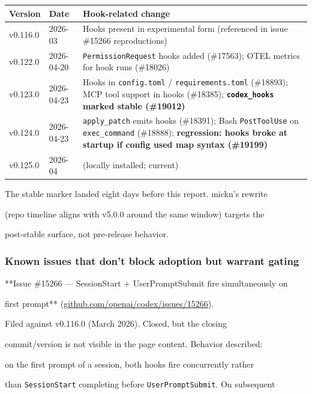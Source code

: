 \documentclass[twocolumn,10pt,letterpaper]{article}
\begin{document}
\vspace{0.4em}
\noindent
\small
\begin{tabularx}{\columnwidth}{@{}XXX@{}}
\toprule
\textbf{Version} & \textbf{Date} & \textbf{Hook-related change} \\
\midrule
v0.116.0 & 2026-03 & Hooks present in experimental form (referenced in issue \#15266 reproductions) \\
v0.122.0 & 2026-04-20 & \texttt{PermissionRequest} hooks added (\#17563); OTEL metrics for hook runs (\#18026) \\
v0.123.0 & 2026-04-23 & Hooks in \texttt{config.toml} / \texttt{requirements.toml} (\#18893); MCP tool support in hooks (\#18385); \textbf{\texttt{codex\_hooks} marked stable (\#19012)} \\
v0.124.0 & 2026-04-23 & \texttt{apply\_patch} emits hooks (\#18391); Bash \texttt{PostToolUse} on \texttt{exec\_command} (\#18888); \textbf{regression: hooks broke at startup if config used map syntax (\#19199)} \\
v0.125.0 & 2026-04 & (locally installed; current) \\
\bottomrule
\end{tabularx}
\vspace{0.4em}

The stable marker landed eight days before this report. mickn's rewrite

(repo timeline aligns with v5.0.0 around the same window) targets the

post-stable surface, not pre-release behavior.


\subsubsection{Known issues that don't block adoption but warrant gating}

**Issue \#15266 — SessionStart + UserPromptSubmit fire simultaneously on

first prompt** (\href{https://github.com/openai/codex/issues/15266}{github.com/openai/codex/issues/15266}).

Filed against v0.116.0 (March 2026). Closed, but the closing

commit/version is not visible in the page content. Behavior described:

on the first prompt of a session, both hooks fire concurrently rather

than \texttt{SessionStart} completing before \texttt{UserPromptSubmit}. On subsequent
\end{document}
